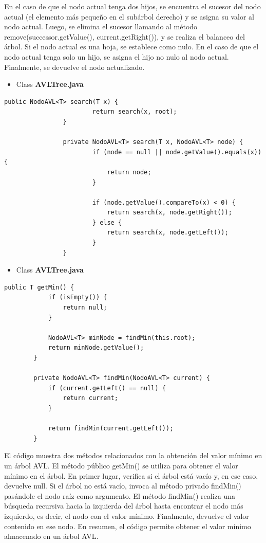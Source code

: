 \documentclass{article}
\begin{document}
En el caso de que el nodo actual tenga dos hijos, se encuentra el sucesor del nodo actual (el elemento más pequeño en el subárbol derecho) y se asigna su valor al nodo actual. Luego, se elimina el sucesor llamando al método remove(successor.getValue(), current.getRight()), y se realiza el balanceo del árbol. Si el nodo actual es una hoja, se establece como nulo. En el caso de que el nodo actual tenga solo un hijo, se asigna el hijo no nulo al nodo actual. Finalmente, se devuelve el nodo actualizado.


\begin{itemize}
        \item Class \textbf{AVLTree.java}
    \end{itemize}
    \begin{lstlisting}[caption={\textbf{Parte 2:}}]
            public NodoAVL<T> search(T x) {
            	        return search(x, root);
            	}
            	
            	private NodoAVL<T> search(T x, NodoAVL<T> node) {
            	        if (node == null || node.getValue().equals(x)) {
            	            return node;
            	        }
            	
            	        if (node.getValue().compareTo(x) < 0) {
            	            return search(x, node.getRight());
            	        } else {
            	            return search(x, node.getLeft());
            	        }
            	}
         \end{lstlisting}
 


\begin{itemize}
        \item Class \textbf{AVLTree.java}
    \end{itemize}
    \begin{lstlisting}[caption={\textbf{Parte 2:}}]
	   public T getMin() {
	        if (isEmpty()) {
	            return null;
	        }
	
	        NodoAVL<T> minNode = findMin(this.root);
	        return minNode.getValue();
	    }
	
	    private NodoAVL<T> findMin(NodoAVL<T> current) {
	        if (current.getLeft() == null) {
	            return current;
	        }
	
	        return findMin(current.getLeft());
	    }
         \end{lstlisting}
El código muestra dos métodos relacionados con la obtención del valor mínimo en un árbol AVL. El método público getMin() se utiliza para obtener el valor mínimo en el árbol. En primer lugar, verifica si el árbol está vacío y, en ese caso, devuelve null. Si el árbol no está vacío, invoca al método privado findMin() pasándole el nodo raíz como argumento. El método findMin() realiza una búsqueda recursiva hacia la izquierda del árbol hasta encontrar el nodo más izquierdo, es decir, el nodo con el valor mínimo. Finalmente, devuelve el valor contenido en ese nodo. En resumen, el código permite obtener el valor mínimo almacenado en un árbol AVL.
\end{document}
